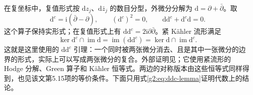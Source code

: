 \ProseParagraphBreak

在复坐标中，复值形式按 \(\mathrm dz_j\)、\(\mathrm d\bar z_j\) 的数目分型，外微分分解为 \(\mathrm d=\partial+\bar\partial\)。取
\begin{equation}\label{g2:eq:dc-convention}
	\mathrm d^c=\mathrm i(\bar\partial-\partial),\qquad
	(\mathrm d^c)^2=0,\qquad
	\mathrm d\mathrm d^c+\mathrm d^c\mathrm d=0.
\end{equation}
这个算子保持实形式；在复值形式上有 \(\mathrm d\mathrm d^c=2\mathrm i\partial\bar\partial\)。紧 Kähler 流形满足
\begin{equation}\label{g2:eq:ddc-lemma}
	\ker\mathrm d^c\cap\operatorname{im}\mathrm d
	=\operatorname{im}(\mathrm d\mathrm d^c)
	=\ker\mathrm d\cap\operatorname{im}\mathrm d^c.
\end{equation}
这就是这里使用的 \(\mathrm d\mathrm d^c\) 引理：一个同时被两张微分消去、且是其中一张微分的边界的形式，实际上可以写成两张微分的复合。外部证明见\cite[第5节，引理5.11及注5.14，第266—267页]{DeligneGriffithsMorganSullivan1975}；它使用紧流形的 Hodge 分解、Green 算子和 Kähler 恒等式。两边的对称版本由这些恒等式同样得到，也见该文第5.15项的等价条件。下面只用式\eqref{g2:eq:ddc-lemma}证明代数上的结论。

